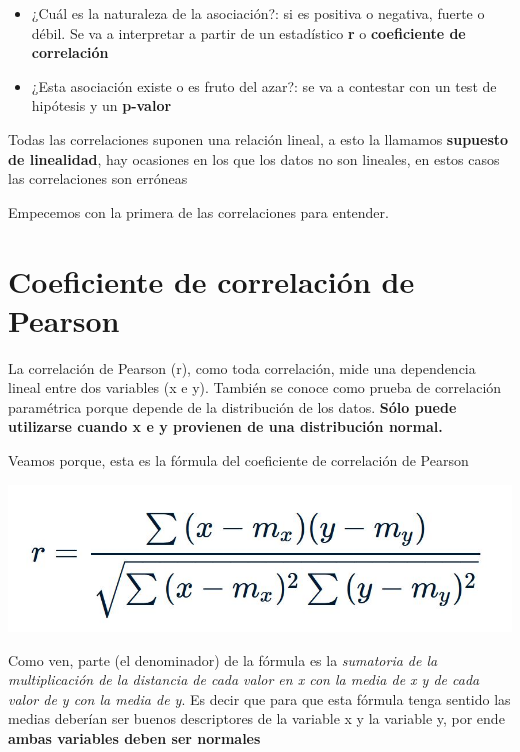 \documentclass[
]{book}
\begin{document}
\begin{itemize}
\item
  ¿Cuál es la naturaleza de la asociación?: si es positiva o negativa, fuerte o débil. Se va a interpretar a partir de un estadístico \textbf{r} o \textbf{coeficiente de correlación}
\item
  ¿Esta asociación existe o es fruto del azar?: se va a contestar con un test de hipótesis y un \textbf{p-valor}
\end{itemize}

Todas las correlaciones suponen una relación lineal, a esto la llamamos \textbf{supuesto de linealidad}, hay ocasiones en los que los datos no son lineales, en estos casos las correlaciones son erróneas

Empecemos con la primera de las correlaciones para entender.

\hypertarget{coeficiente-de-correlaciuxf3n-de-pearson}{%
\section{Coeficiente de correlación de Pearson}\label{coeficiente-de-correlaciuxf3n-de-pearson}}

La correlación de Pearson (r), como toda correlación, mide una dependencia lineal entre dos variables (x e y). También se conoce como prueba de correlación paramétrica porque depende de la distribución de los datos. \textbf{Sólo puede utilizarse cuando x e y provienen de una distribución normal.}

Veamos porque, esta es la fórmula del coeficiente de correlación de Pearson

\includegraphics[width=12.17in]{img/r_pearson}

Como ven, parte (el denominador) de la fórmula es la \emph{sumatoria de la multiplicación de la distancia de cada valor en x con la media de x y de cada valor de y con la media de y}. Es decir que para que esta fórmula tenga sentido las medias deberían ser buenos descriptores de la variable x y la variable y, por ende \textbf{ambas variables deben ser normales}
\end{document}
